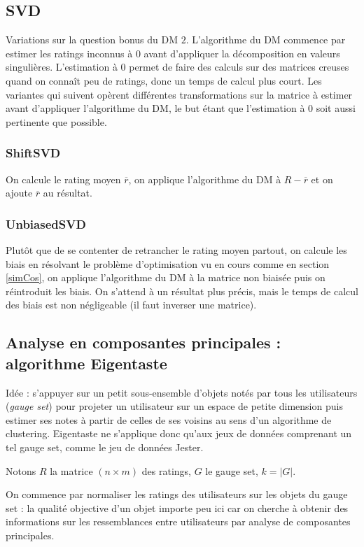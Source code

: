 \documentclass[11pt, openany, a4paper]{article}
\begin{document}
	\subsection{SVD}
	Variations sur la question bonus du DM $2$. L'algorithme du DM commence par estimer les ratings inconnus à $0$ avant d'appliquer la décomposition en valeurs singulières. L'estimation à 0 permet de faire des calculs sur des matrices creuses quand on connaît peu de ratings, donc un temps de calcul plus court. Les variantes qui suivent opèrent différentes transformations sur la matrice à estimer avant d'appliquer l'algorithme du DM, le but étant que l'estimation à 0 soit aussi pertinente que possible.

		\subsubsection{ShiftSVD} 
		
		On calcule le rating moyen $\overline{r}$, on applique l'algorithme du DM à $R-\overline{r}$ et on ajoute $\overline{r}$ au résultat.
			
		\subsubsection{UnbiasedSVD}
		
		Plutôt que de se contenter de retrancher le rating moyen partout, on calcule les biais en résolvant le problème d'optimisation vu en cours comme en section \ref{simCos}, on applique l'algorithme du DM à la matrice non biaisée puis on réintroduit les biais.
		On s'attend à un résultat plus précis, mais le temps de calcul des biais est non négligeable (il faut inverser une matrice).
		
	\subsection{Analyse en composantes principales : algorithme Eigentaste\cite{Goldberg2001}}
		Idée : s'appuyer sur un petit sous-ensemble d'objets notés par tous les utilisateurs (\emph{gauge set}) pour projeter un utilisateur sur un espace de petite dimension puis estimer ses notes à partir de celles de ses voisins au sens d'un algorithme de clustering. Eigentaste ne s'applique donc qu'aux jeux de données comprenant un tel gauge set, comme le jeu de données Jester.
		
		Notons $R$ la matrice $(n\times m)$ des ratings, $G$ le gauge set, $k=|G|$.
		
		On commence par normaliser les ratings des utilisateurs sur les objets du gauge set : la qualité objective d'un objet importe peu ici car on cherche à obtenir des informations sur les ressemblances entre utilisateurs par analyse de composantes principales.
		
\end{document}
